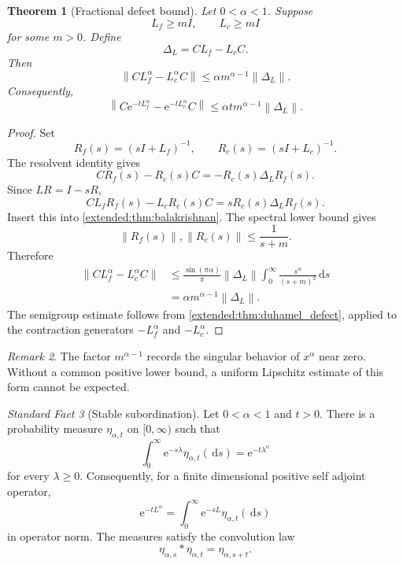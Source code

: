 \documentclass[11pt,a4paper]{article}
\newtheorem{theorem}{Theorem}[section]
\theoremstyle{definition}
\theoremstyle{remark}
\newtheorem{remark}[theorem]{Remark}
\newcommand{\norm}[1]{\left\lVert#1\right\rVert}
\newtheorem{standardfact}[theorem]{Standard Fact}
\newcommand{\e}{\mathrm e}
\newcommand{\dd}{\,\mathrm d}
\begin{document}
\begin{theorem}[Fractional defect bound]\label{extended:record:070}\label{extended:thm:fractional_defect}
Let \(0<\alpha<1\). Suppose
\[
L_f\geq mI,
\qquad
L_c\geq mI
\]
for some \(m>0\). Define
\[
\Delta_L=CL_f-L_cC.
\]
Then
\[
\norm{CL_f^\alpha-L_c^\alpha C}
\leq
\alpha m^{\alpha-1}\norm{\Delta_L}.
\]
Consequently,
\[
\norm{
C\e^{-tL_f^\alpha}
-
\e^{-tL_c^\alpha}C
}
\leq
\alpha t m^{\alpha-1}\norm{\Delta_L}.
\]
\end{theorem}

\begin{proof}
Set
\[
R_f(s)=(sI+L_f)^{-1},
\qquad
R_c(s)=(sI+L_c)^{-1}.
\]
The resolvent identity gives
\[
CR_f(s)-R_c(s)C
=
-R_c(s)\Delta_LR_f(s).
\]
Since \(LR=I-sR\),
\[
CL_fR_f(s)-L_cR_c(s)C
=
sR_c(s)\Delta_LR_f(s).
\]
Insert this into \cref{extended:thm:balakrishnan}. The spectral lower bound gives
\[
\norm{R_f(s)},\norm{R_c(s)}
\leq
\frac{1}{s+m}.
\]
Therefore
\[
\begin{aligned}
\norm{CL_f^\alpha-L_c^\alpha C}
&\leq
\frac{\sin(\pi\alpha)}{\pi}
\norm{\Delta_L}
\int_0^\infty
\frac{s^\alpha}{(s+m)^2}\dd s\\
&=
\alpha m^{\alpha-1}\norm{\Delta_L}.
\end{aligned}
\]
The semigroup estimate follows from \cref{extended:thm:duhamel_defect}, applied to the contraction generators \(-L_f^\alpha\) and \(-L_c^\alpha\).
\end{proof}

\begin{remark}\label{extended:record:071}
The factor \(m^{\alpha-1}\) records the singular behavior of \(x^\alpha\) near zero. Without a common positive lower bound, a uniform Lipschitz estimate of this form cannot be expected.
\end{remark}

\begin{standardfact}[Stable subordination]\label{extended:record:072}\label{extended:fact:stable_subordination}
Let \(0<\alpha<1\) and \(t>0\). There is a probability measure \(\eta_{\alpha,t}\) on \([0,\infty)\) such that
\[
\int_0^\infty \e^{-s\lambda}\eta_{\alpha,t}(\dd s)
=
\e^{-t\lambda^\alpha}
\]
for every \(\lambda\geq0\). Consequently, for a finite dimensional positive self adjoint operator,
\[
\e^{-tL^\alpha}
=
\int_0^\infty
\e^{-sL}\eta_{\alpha,t}(\dd s)
\]
in operator norm. The measures satisfy the convolution law
\[
\eta_{\alpha,s}*\eta_{\alpha,t}
=
\eta_{\alpha,s+t}.
\]
\end{standardfact}
\end{document}
